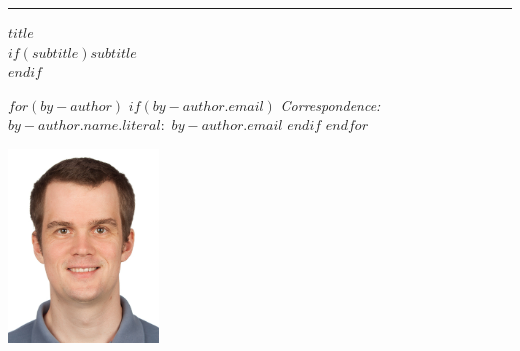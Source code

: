 
\raggedleft %
\rule{1pt}{\textheight} %
\hspace{0.05\textwidth} %
\begin{minipage}[b][\textheight][s]{0.85\textwidth}

    \raggedright
    {\large\bfseries\nohyphens{$title$}}\\[2\baselineskip]
    $if(subtitle)${\large\textit{$subtitle$}}\\[4\baselineskip]$endif$

    \vspace{1\baselineskip}

    $for(by-author)$
    $if(by-author.email)$
    \textit{Correspondence:}~$by-author.name.literal$:~$by-author.email$
    $endif$
    $endfor$


    \vfill

    \includegraphics[width=4cm]{img/julian_profile}

    \vspace{0.1\textheight}


\end{minipage}